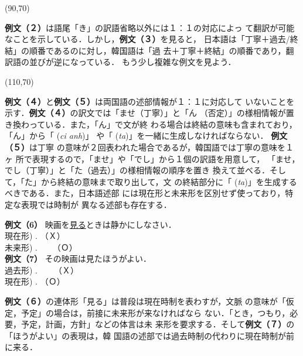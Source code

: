 \atari(90,70)
\vspace{5mm}

{\bf 例文（２）}は語尾「き」の訳語省略以外には１：１の対応によっ
て翻訳が可能なことを示している．しかし，{\bf 例文（３）}を見ると，
日本語は「丁寧＋過去/終結」の順番であるのに対し，韓国語は「過
去＋丁寧＋終結」の順番であり，翻訳語の並びが逆になっている．
もう少し複雑な例文を見よう．

\vspace{5mm}
\atari(110,70)
\vspace{5mm}

{\bf 例文（４）}と{\bf 例文（５）}は両国語の述部情報が１：１に対応して
いないことを示す．{\bf 例文（４）}の訳文では「ませ（丁寧）」と「ん
（否定）」の様相情報が置き換わっている．また，「ん」で文が終
わる場合は終結の意味も含まれており，「ん」から「 ({\it ci anh})」
や「 ({\it ta})」を一緒に生成しなければならない．
{\bf 例文（５）}は丁寧
の意味が２回表われた場合であるが，韓国語では丁寧の意味を１ヶ
所で表現するので，「ませ」や「でし」から１個の訳語を用意して，
「ませ，でし（丁寧）」と「た（過去）」の様相情報の順序を置き
換えて並べる．そして，「た」から終結の意味まで取り出して，文
の終結部分に「 ({\it ta})」を生成するべきである．また，日本語述部
には現在形と未来形を区別せず使っており，特定な表現では時制が
異なる述部も存在する．


\vspace{2mm}
\noindent
\hspace*{25mm}
{\bf 例文（6）} 映画を\underline{見る}ときは静かにしなさい．\\
\hspace*{42mm}
現在形) \underline{}
 . （Ｘ）\\
\hspace*{42mm}
未来形) \underline{}
 . \ \ \  （Ｏ）\\
\hspace*{25mm}
{\bf 例文（7）} その映画は見たほうがよい．\\
\hspace*{42mm}
過去形) \underline{}
 .\ \ \ \  （Ｘ）\\
\hspace*{42mm}
現在形) \underline{}
 . （Ｏ）
\vspace{2mm}

{\bf 例文（６）}の連体形「見る」は普段は現在時制を表わすが，文脈
の意味が「仮定，予定」の場合は，前接に未来形が来なければなら
ない．「とき，つもり，必要，予定，計画，方針」などの体言は未
来形を要求する．そして{\bf 例文（７）}の「ほうがよい」の表現は，韓
国語の述部では過去時制の代わりに現在時制が前に来る．

